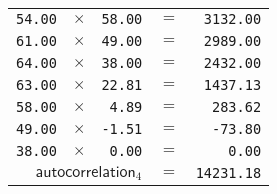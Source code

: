 {\begin{multicols}{2}
\begin{tabular}{rrrrr}
  \texttt{54.00} & $\times$ & \texttt{58.00} & $=$ & \texttt{3132.00} \\
  \texttt{61.00} & $\times$ & \texttt{49.00} & $=$ & \texttt{2989.00} \\
  \texttt{64.00} & $\times$ & \texttt{38.00} & $=$ & \texttt{2432.00} \\
  \texttt{63.00} & $\times$ & \texttt{22.81} & $=$ & \texttt{1437.13} \\
  \texttt{58.00} & $\times$ & \texttt{4.89} & $=$ & \texttt{283.62} \\
  \texttt{49.00} & $\times$ & \texttt{-1.51} & $=$ & \texttt{-73.80} \\
  \texttt{38.00} & $\times$ & \texttt{0.00} & $=$ & \texttt{0.00} \\
  \hline
  \multicolumn{3}{r}{$\textsf{autocorrelation}_4$} & $=$ & \texttt{14231.18} \\
\end{tabular}
\end{multicols}
}

\clearpage

